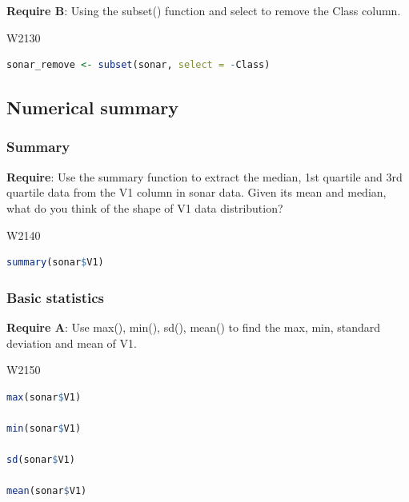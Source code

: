 \noindent\textbf{Require B}: Using the subset() function and select to remove the Class column.


\begin{ocg}{}{W213}{0}
\begin{lstlisting}[language = R]
sonar_remove <- subset(sonar, select = -Class)
\end{lstlisting}
\end{ocg}

\subsection{Numerical summary}

\subsubsection{Summary}

\noindent\textbf{Require}: Use the summary function to extract the median, 1st quartile and 3rd quartile data from the V1 column in sonar data. Given its mean and median, what do you think of the shape of V1 data distribution?


\begin{ocg}{}{W214}{0}
\begin{lstlisting}[language = R]
summary(sonar$V1)
\end{lstlisting}
\end{ocg}

\subsubsection{Basic statistics}

\noindent\textbf{Require A}: Use max(), min(), sd(), mean() to find the max, min, standard deviation and mean of V1.


\begin{ocg}{}{W215}{0}
\begin{lstlisting}[language = R]
max(sonar$V1)

min(sonar$V1)

sd(sonar$V1)

mean(sonar$V1)
\end{lstlisting}
\end{ocg}

